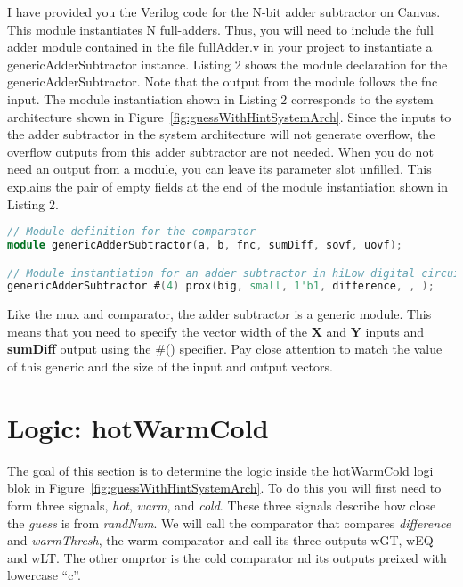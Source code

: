 I have provided you the Verilog code for the N-bit adder subtractor on
Canvas. This module instantiates N full-adders. Thus, you will need to
include the full adder module contained in the file fullAdder.v in your
project to instantiate a genericAdderSubtractor instance. Listing 2
shows the module declaration for the genericAdderSubtractor. Note that
the output from the module follows the fnc input. The module
instantiation shown in Listing 2 corresponds to the system architecture
shown in Figure~\ref{fig:guessWithHintSystemArch}. Since the inputs to the adder subtractor in the
system architecture will not generate overflow, the overflow outputs
from this adder subtractor are not needed. When you do not need an
output from a module, you can leave its parameter slot unfilled. This
explains the pair of empty fields at the end of the module instantiation
shown in Listing 2.

\begin{lstlisting}[language=Verilog,
 caption={Top, module definition for an adder subtractor.  Bottom, module instantation 
 of the adder subtractor in Figure~\ref{fig:guessWithHintSystemArch}.},
 label={listing:adderSubtractor},
 frame=single]
// Module definition for the comparator
module genericAdderSubtractor(a, b, fnc, sumDiff, sovf, uovf);

// Module instantiation for an adder subtractor in hiLow digital circuit
genericAdderSubtractor #(4) prox(big, small, 1'b1, difference, , );
\end{lstlisting}


Like the mux and comparator, the adder subtractor is a generic module.
This means that you need to specify the vector width of the \textbf{X}
and \textbf{Y} inputs and \textbf{sumDiff} output using the \#()
specifier. Pay close attention to match the value of this generic and
the size of the input and output vectors.


\section{Logic: hotWarmCold}

The goal of this section is to determine the logic inside the hotWarmCold logi blok
in Figure~\ref{fig:guessWithHintSystemArch}.  To do this you will first need to form three 
signals, \emph{hot}, \emph{warm}, and \emph{cold}.  These three signals describe how close the 
\emph{guess} is from \emph{randNum}. We will call the comparator that compares \emph{difference} 
and \emph{warmThresh}, the warm comparator and call its three outputs wGT, wEQ and wLT.
The other omprtor is the cold comparator nd its outputs preixed with  lowercase ``c''.

